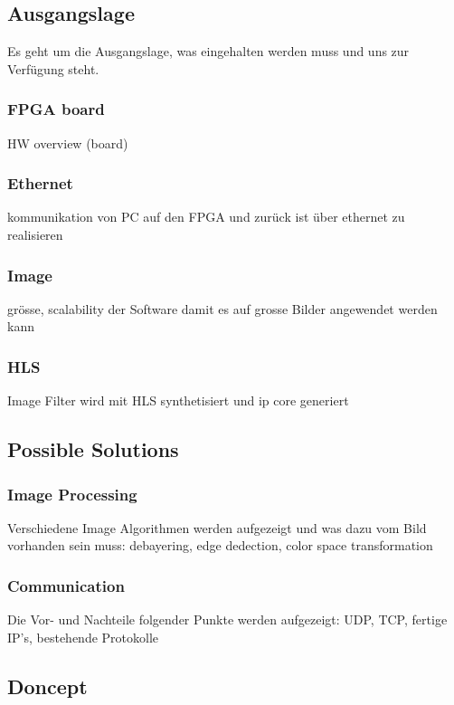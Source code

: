 \subsection{Ausgangslage}
Es geht um die Ausgangslage, was eingehalten werden muss und uns zur Verfügung steht. 

\subsubsection{FPGA board}
HW overview (board)

\subsubsection{Ethernet}
kommunikation von PC auf den FPGA und zurück ist über ethernet zu realisieren 

\subsubsection{Image}
grösse, scalability der Software damit es auf grosse Bilder angewendet werden kann

\subsubsection{HLS}
Image Filter wird mit HLS synthetisiert und ip core generiert

\subsection{Possible Solutions}
\subsubsection{Image Processing}
Verschiedene Image Algorithmen werden aufgezeigt und was dazu vom Bild vorhanden sein muss: 
debayering, edge dedection, color space transformation

\subsubsection{Communication}
Die Vor- und Nachteile folgender Punkte werden aufgezeigt:
UDP, TCP, fertige IP's, bestehende Protokolle

\subsection{Doncept}
